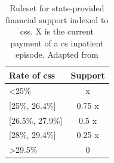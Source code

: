 \begin{table}[htbp]
  \centering
  \caption[Ruleset for financial support indexed to \acsp{cs}.]{Ruleset for state-provided financial support indexed to \acp{cs}. X is the current payment of a \ac{cs} inpatient episode. Adapted from \cite{acssTermosReferenciaPara2023}}
  \label{tab:corrections}
  \renewcommand{\arraystretch}{1.2} %
  \setlength{\tabcolsep}{12pt} %
  \begin{tabular}{lc}
      \hline
Rate of \acp{cs}   & Support \\
    \hline
\textless 25\%       & x       \\
{[}25\%, 26.4\%{]}   & 0.75 x   \\
{[}26.5\%, 27.9\%{]} & 0.5 x    \\
{[}28\%, 29.4\%{]}   & 0.25 x   \\
\textgreater{}29.5\% & 0      \\
    \hline
\end{tabular}
\end{table}